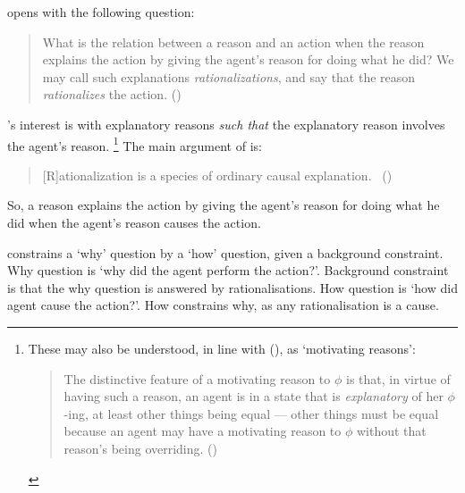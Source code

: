 \begin{note}
  \citeauthor{Davidson:1963aa} opens  with the following question:
  \begin{quote}
    What is the relation between a reason and an action when the reason explains the action by giving the agent's reason for doing what he did?
    We may call such explanations \emph{rationalizations}, and say that the reason \emph{rationalizes} the action.%
    \mbox{}\hfill\mbox{(\citeyear[685]{Davidson:1963aa})}
  \end{quote}
  \citeauthor{Davidson:1963aa}'s interest is with explanatory reasons \emph{such that} the explanatory reason involves the agent's reason.%
  \footnote{
    These may also be understood, in line with \citeauthor{Smith:1994wo} (\citeyear{Smith:1994wo}), as `motivating reasons':
    \begin{quote}
      The distinctive feature of a motivating reason to \(\phi\) is that, in virtue of having such a reason, an agent is in a state that is \emph{explanatory} of her \(\phi\)-ing, at least other things being equal --- other things must be equal because an agent may have a motivating reason to \(\phi\) without that reason's being overriding.%
      \mbox{}\hfill\mbox{(\citeyear[96]{Smith:1994wo})}
    \end{quote}
  }
  The main argument of  is:
  \begin{quote}
    [R]ationalization is a species of ordinary causal explanation.%
    \mbox{ }\hfill\mbox{(\citeyear[685]{Davidson:1963aa})}
  \end{quote}
  So, a reason explains the action by giving the agent's reason for doing what he did when the agent's reason causes the action.

  \citeauthor{Davidson:1963aa} constrains a `why' question by a `how' question, given a background constraint.
  Why question is `why did the agent perform the action?'.
  Background constraint is that the why question is answered by rationalisations.
  How question is `how did agent cause the action?'.
  How constrains why, as any rationalisation is a cause.
\end{note}

